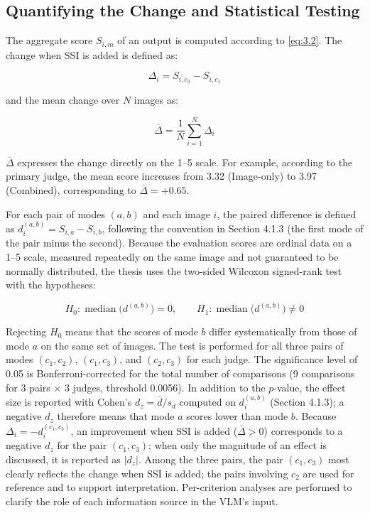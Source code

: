 \documentclass[12pt,a4paper]{report}
\begin{document}
\subsection{Quantifying the Change and Statistical Testing}

The aggregate score $S_{i,m}$ of an output is computed according to \eqref{eq:3.2}. The change when SSI is added is defined as:

\begin{equation}
\Delta_i=S_{i,c_3}-S_{i,c_1}
\label{eq:3.17}
\end{equation}

and the mean change over $N$ images as:

\begin{equation}
\overline{\Delta}=\frac{1}{N}\sum_{i=1}^{N}\Delta_i
\label{eq:3.18}
\end{equation}

$\overline{\Delta}$ expresses the change directly on the 1--5 scale. For example, according to the primary judge, the mean score increases from 3.32 (Image-only) to 3.97 (Combined), corresponding to $\overline{\Delta}=+0.65$.

For each pair of modes $(a,b)$ and each image $i$, the paired difference is defined as $d_i^{(a,b)} = S_{i,a} - S_{i,b}$, following the convention in Section 4.1.3 (the first mode of the pair minus the second). Because the evaluation scores are ordinal data on a 1--5 scale, measured repeatedly on the same image and not guaranteed to be normally distributed, the thesis uses the two-sided Wilcoxon signed-rank test with the hypotheses:

\begin{equation}
H_0: \operatorname{median}\big(d^{(a,b)}\big) = 0, \qquad H_1: \operatorname{median}\big(d^{(a,b)}\big) \neq 0
\label{eq:3.19}
\end{equation}

Rejecting $H_0$ means that the scores of mode $b$ differ systematically from those of mode $a$ on the same set of images. The test is performed for all three pairs of modes $(c_1,c_2)$, $(c_1,c_3)$, and $(c_2,c_3)$ for each judge. The significance level of 0.05 is Bonferroni-corrected for the total number of comparisons (9 comparisons for 3 pairs $\times$ 3 judges, threshold 0.0056). In addition to the $p$-value, the effect size is reported with Cohen's $d_z = \bar{d}/s_d$ computed on $d_i^{(a,b)}$ (Section 4.1.3); a negative $d_z$ therefore means that mode $a$ scores lower than mode $b$. Because $\Delta_i = -d_i^{(c_1,c_3)}$, an improvement when SSI is added ($\overline{\Delta} > 0$) corresponds to a negative $d_z$ for the pair $(c_1,c_3)$; when only the magnitude of an effect is discussed, it is reported as $|d_z|$. Among the three pairs, the pair $(c_1,c_3)$ most clearly reflects the change when SSI is added; the pairs involving $c_2$ are used for reference and to support interpretation. Per-criterion analyses are performed to clarify the role of each information source in the VLM's input.
\end{document}
